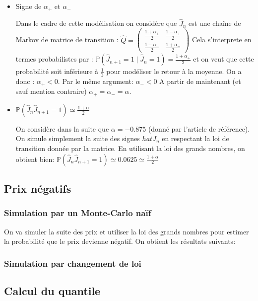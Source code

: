 \documentclass[a4paper,11pt]{article}
\begin{document}
\begin{itemize}

\item Signe de $\alpha_{+}$ et $\alpha_{-}$

Dans le cadre de cette modélisation on considère que $\hat{J}_{n}$ est une chaîne de Markov de matrice de transition :
$\hat{Q} = \begin{pmatrix}
\frac{1+\alpha_{+}}{2} & \frac{1-\alpha_{+}}{2} \\ 
 \frac{1-\alpha_{-}}{2}  & \frac{1+\alpha_{-}}{2} 
\end{pmatrix}$
Cela s'interprete en termes probabilistes par :
$\mathbb{P}(\hat{J}_{n+1}=1\mid \hat{J}_{n}=1)=\frac{1+\alpha_{+}}{2}$ et on veut que cette probabilité soit inférieure à $\frac{1}{2}$ pour modéliser le retour à la moyenne. On a donc : $\alpha_{+}<0$. Par le même argument: $\alpha_{-}<0$
A partir de maintenant (et sauf mention contraire) $\alpha_{+}=\alpha_{-}=\alpha$.

\item $\mathbb{P} (\hat{J}_{n}\hat{J}_{n+1}=1) \simeq \frac{1+\alpha }{2}$

On considère dans la suite que $\alpha = -0.875$ (donné par l'article de référence). On simule simplement la suite des signes $hat{J}_{n}$  en respectant la loi de transition donnée par la matrice. En utilisant la loi des grands nombres, on obtient bien:
$\mathbb{P} (\hat{J}_{n}\hat{J}_{n+1}=1) \simeq 0.0625 \simeq \frac{1+\alpha }{2}$

\end{itemize}

\subsection{Prix négatifs}


\subsubsection{Simulation par un Monte-Carlo naïf}
On va simuler la suite des prix et utiliser la loi des grands nombres pour estimer la probabilité que le prix devienne négatif. On obtient les résultats suivants:


\subsubsection{Simulation par changement de loi}


\subsection{Calcul du quantile}
\end{document}
